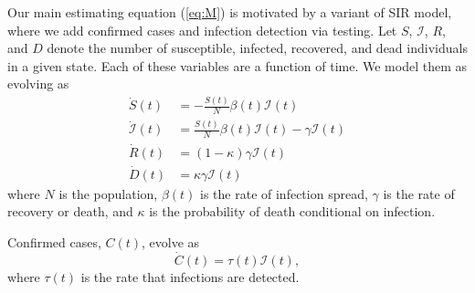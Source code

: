 \documentclass[11pt,reqno,letter]{amsart}
\theoremstyle{definition}
\providecommand{\Infected}{{\mathcal{I}}}
\providecommand{\Recovered}{{R}}
\begin{document}
 Our main estimating equation (\ref{eq:M}) is motivated by a variant of SIR
model, where we add confirmed cases and infection detection via testing.
Let $S$, $\Infected$, $\Recovered$, and $D$ denote the number of susceptible,
infected, recovered, and dead individuals in a given state. Each of these variables are a function of time. We model
them as evolving as
\begin{align}
  \dot{S}(t) & = -\frac{S(t)}{N} \beta(t) \Infected(t) \label{eq:s} \\
  \dot{\Infected}(t) & = \frac{S(t)}{N} \beta(t) \Infected(t) - \gamma  \Infected(t) \label{eq:i}\\
  \dot{\Recovered}(t) & = (1-\kappa) \gamma  \Infected(t) \label{eq:r}\\ %
  \dot{D}(t) & = \kappa \gamma \Infected(t) %
  \label{eq:d}
\end{align}
where $N$ is the population, $\beta(t)$ is the rate of infection
spread, $\gamma$ is the rate of recovery or death, and $\kappa$ is the
probability of death conditional on infection.

Confirmed cases, $C(t)$, evolve as
\begin{equation}
  \dot{C}(t) = \tau(t) \Infected(t), \label{eq:c}
\end{equation}
where $\tau(t)$ is the rate that infections are detected.
\end{document}
